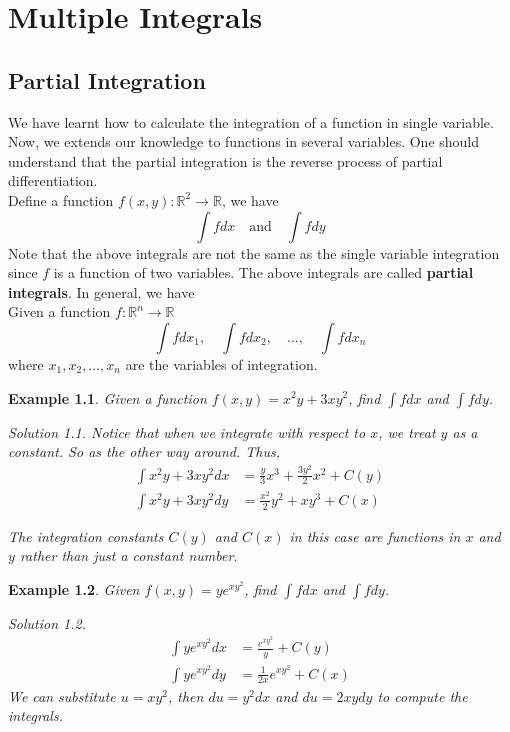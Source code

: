\documentclass{book}
\newtheorem{example}{Example}[chapter]
\theoremstyle{remark}
\newtheorem*{solution}{Solution}
\newcommand{\R}{\mathbb{R}}
\begin{document}
\chapter{Multiple Integrals}
\section{Partial Integration}
    We have learnt how to calculate the integration of a function in single variable. Now, we extends our knowledge to functions in several variables. One should understand that the partial integration is the reverse process of partial differentiation.
    \\\indent Define a function $f(x,y):\R^2\to\R$, we have 
    \[\int f dx \quad \text{and}\quad \int f dy\]
    Note that the above integrals are not the same as the single variable integration since $f$ is a function of two variables. The above integrals are called \textbf{partial integrals}. In general, we have 
    \\Given a function $f:\R^n \to \R$
    \[\int f dx_1,\quad \int f dx_2,\quad \dots ,\quad \int f dx_n\]
    where $x_1,x_2,\ldots,x_n$ are the variables of integration.
    \begin{example}
        Given a function $f(x,y)=x^2y+3xy^2$, find $\int f dx$ and $\int f dy$.
        \begin{solution}
            Notice that when we integrate with respect to $x$, we treat $y$ as a constant. So as the other way around. Thus, 
            \[
            \begin{split}
                \int x^2y+3xy^2 dx&= \frac{y}{3}x^3+\frac{3y^2}{2}x^2 +C(y)\\
                \int x^2y+3xy^2 dy&= \frac{x^2}{2}y^2+xy^3 +C(x)
            \end{split}
            \]
        \end{solution}
        The integration constants $C(y)$ and $C(x)$ in this case are functions in $x$ and $y$ rather than just a constant number.
    \end{example}

    \begin{example}
        Given $f(x,y)=ye^{xy^2}$, find $\int f dx$ and $\int f dy$.
        \begin{solution}
            \[
            \begin{split}
                \int ye^{xy^2} dx&= \frac{e^{xy^2}}{y}+C(y)\\
                \int ye^{xy^2} dy&= \frac{1}{2x}e^{xy^2}+C(x)
            \end{split}
            \]
            We can substitute $u=xy^2$, then $du=y^2dx$ and $du=2xy dy$ to compute the integrals.
        \end{solution}
    \end{example}
\end{document}
